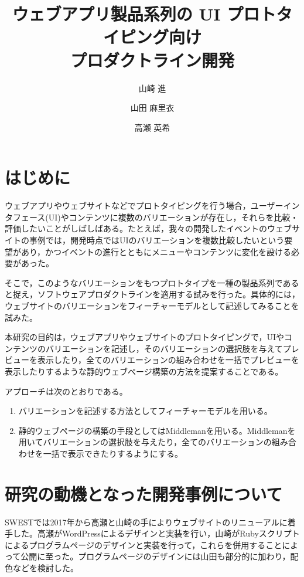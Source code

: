 \documentclass[submit,techrep]{ipsj}
\title {ウェブアプリ製品系列の UI プロトタイピング向け \\ プロダクトライン開発}
\author{山崎 進}{Yamazaki Susumu}{Kitakyu-u}[zacky@kitakyu-u.ac.jp]
\author{山田 麻里衣}{Yamada Marii}{Kitakyu-u}[x6mcb015@eng.kitakyu-u.ac.jp]
\author{高瀬 英希}{Takase Hideki}{Kyoto-u}[takase@i.kyoto-u.ac.jp]
\begin{document}
\maketitle

\section{はじめに}

ウェブアプリやウェブサイトなどでプロトタイピングを行う場合，ユーザーインタフェース(UI)やコンテンツに複数のバリエーションが存在し，それらを比較・評価したいことがしばしばある。たとえば，我々の開発したイベントのウェブサイトの事例\cite{SWEST}では，開発時点ではUIのバリエーションを複数比較したいという要望があり，かつイベントの進行とともにメニューやコンテンツに変化を設ける必要があった。

そこで，このようなバリエーションをもつプロトタイプを一種の製品系列であると捉え，ソフトウェアプロダクトライン\cite{SPLE}\cite{FORM}を適用する試みを行った。具体的には，ウェブサイトのバリエーションをフィーチャーモデル\cite{FORM}として記述してみることを試みた。

本研究の目的は，ウェブアプリやウェブサイトのプロトタイピングで，UIやコンテンツのバリエーションを記述し，そのバリエーションの選択肢を与えてプレビューを表示したり，全てのバリエーションの組み合わせを一括でプレビューを表示したりするような静的ウェブページ構築の方法を提案することである。

アプローチは次のとおりである。

\begin{enumerate}
 \item バリエーションを記述する方法としてフィーチャーモデル\cite{FORM}を用いる。
 \item 静的ウェブページの構築の手段としてはMiddleman\cite{Middleman}を用いる。Middlemanを用いてバリエーションの選択肢を与えたり，全てのバリエーションの組み合わせを一括で表示できたりするようにする。
\end{enumerate}

\section{研究の動機となった開発事例について}

SWEST\cite{SWEST}では2017年から高瀬と山崎の手によりウェブサイトのリニューアルに着手した。高瀬がWordPressによるデザインと実装を行い，山崎がRubyスクリプトによるプログラムページのデザインと実装を行って，これらを併用することによって公開に至った。プログラムページのデザインには山田も部分的に加わり，配色などを検討した。
\end{document}
